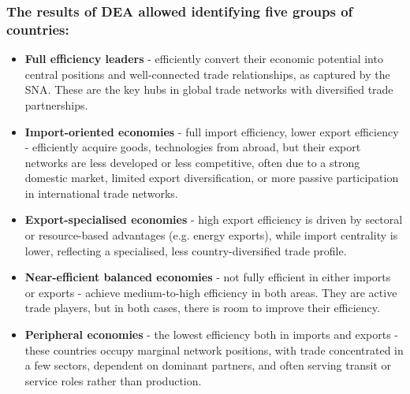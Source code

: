 \documentclass[aspectratio=169]{beamer}
\begin{document}
\begin{frame}
    \frametitle{The results of DEA allowed identifying five groups of countries: }
\small

    \begin{itemize}
        \item \textbf{Full efficiency leaders} - efficiently convert their economic potential into central positions and well-connected trade relationships, as captured by the SNA. These are the key hubs in global trade networks with diversified trade partnerships. %
        \item \textbf{Import-oriented economies} - full import efficiency, lower export efficiency - efficiently acquire goods, technologies from abroad, but their export networks are less developed or less competitive, often due to a strong domestic market, limited export diversification, or more passive participation in international trade networks.
        \item \textbf{Export-specialised economies} - high export efficiency is driven by sectoral or resource-based advantages (e.g. energy exports), while import centrality is lower, reflecting a specialised, less country-diversified trade profile.
        \item \textbf{Near-efficient balanced economies} - not fully efficient in either imports or exports - achieve medium-to-high efficiency in both areas. They are active trade players, but in both cases, there is room to improve their efficiency.
        \item \textbf{Peripheral economies} - the lowest efficiency both in imports and exports - these countries occupy marginal network positions, with trade concentrated in a few sectors, dependent on dominant partners, and often serving transit or service roles rather than production.          %
    \end{itemize}
\end{frame}
\end{document}
